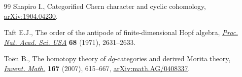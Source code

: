 \documentclass[10pt,a4paper]{amsart}
\numberwithin{equation}{section}
\begin{document}
\begin{thebibliography}{99}
Shapiro I., Categorified {C}hern character and cyclic cohomology,
 \href{https://arxiv.org/abs/1904.04230}{arXiv:1904.04230}.

Taft E.J., The order of the antipode of finite-dimensional {H}opf algebra,
 \href{https://doi.org/10.1073/pnas.68.11.2631}{\textit{Proc. Nat. Acad. Sci. USA}} \textbf{68} (1971), 2631--2633.

To\"en B., The homotopy theory of {$dg$}-categories and derived {M}orita
 theory, \href{https://doi.org/10.1007/s00222-006-0025-y}{\textit{Invent. Math.}} \textbf{167} (2007), 615--667,
 \href{https://arxiv.org/abs/math.AG/0408337}{arXiv:math.AG/0408337}.

\end{thebibliography}
\end{document}

